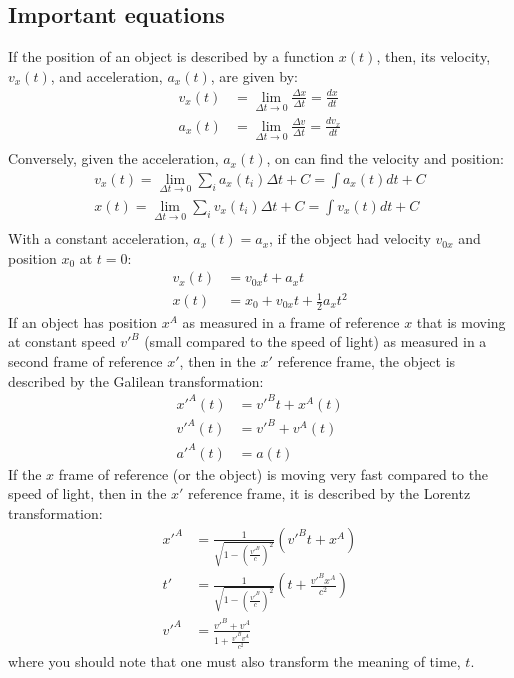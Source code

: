 \subsection{Important equations}
If the position of an object is described by a function $x(t)$, then, its velocity, $v_x(t)$, and acceleration, $a_x(t)$, are given by:
\begin{align*}
v_x(t)&=\lim_{\Delta t\to 0}\frac{\Delta x}{\Delta t}=\frac{dx}{dt}\\
a_x(t)&=\lim_{\Delta t\to 0}\frac{\Delta v}{\Delta t}=\frac{dv_x}{dt}\\
\end{align*}
Conversely, given the acceleration, $a_x(t)$, on can find the velocity and position:
\begin{align*}
v_x(t)=\lim_{\Delta t\to 0}\sum_ia_x(t_i)\Delta t+C=\int a_x(t)dt+C\\
x(t)=\lim_{\Delta t\to 0}\sum_iv_x(t_i)\Delta t+C=\int v_x(t)dt+C\\
\end{align*}
With a constant acceleration, $a_x(t)=a_x$, if the object had velocity $v_{0x}$ and position $x_0$ at $t=0$:
\begin{align*}
v_x(t)&=v_{0x}t+a_xt\\
x(t)&=x_0+v_{0x}t+\frac{1}{2}a_xt^2
\end{align*}
If an object has position $x^A$ as measured in a frame of reference $x$ that is moving at constant speed $v'^B$ (small compared to the speed of light) as measured in a second frame of reference $x'$, then in the $x'$ reference frame, the object is described by the Galilean transformation:
\begin{align*}
x'^A(t) &= v'^Bt + x^A(t)\\
v'^A(t) &=v'^B+v^A(t)\\
a'^A(t) &= a(t)
\end{align*}
If the $x$ frame of reference (or the object) is moving very fast compared to the speed of light, then in the $x'$ reference frame, it is described by the Lorentz transformation:
\begin{align*}
x'^A&=\frac{1}{\sqrt{1-\left(\frac{v'^B}{c}\right)^2}}(v'^Bt+x^A)\\
t'&=\frac{1}{\sqrt{1-\left(\frac{v'^B}{c}\right)^2}}\left(  t+\frac{v'^Bx^A}{c^2} \right)\\
v'^A&=\frac{v'^B+v^A}{1+\frac{v'^Bv^A}{c^2}}
\end{align*}
where you should note that one must also transform the meaning of time, $t$.
